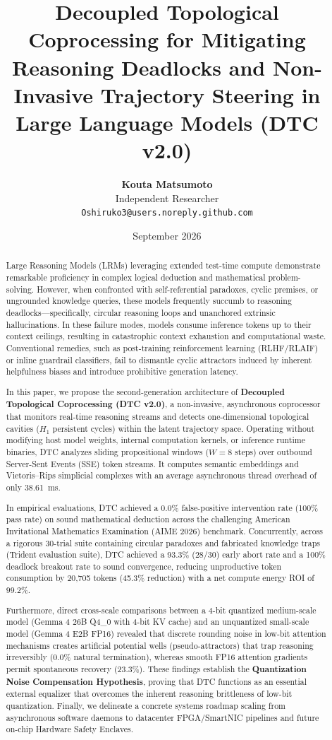 \documentclass[11pt,a4paper]{article}
\title{\textbf{\Large Decoupled Topological Coprocessing for Mitigating Reasoning Deadlocks and Non-Invasive Trajectory Steering in Large Language Models (DTC v2.0)}}
\author{\textbf{Kouta Matsumoto}\\[0.2em]
\normalsize Independent Researcher\\
\normalsize \texttt{Oshiruko3@users.noreply.github.com}}
\date{September 2026}
\begin{document}
\maketitle

\begin{abstract}
\noindent Large Reasoning Models (LRMs) leveraging extended test-time compute demonstrate remarkable proficiency in complex logical deduction and mathematical problem-solving. However, when confronted with self-referential paradoxes, cyclic premises, or ungrounded knowledge queries, these models frequently succumb to reasoning deadlocks---specifically, circular reasoning loops and unanchored extrinsic hallucinations. In these failure modes, models consume inference tokens up to their context ceilings, resulting in catastrophic context exhaustion and computational waste. Conventional remedies, such as post-training reinforcement learning (RLHF/RLAIF) or inline guardrail classifiers, fail to dismantle cyclic attractors induced by inherent helpfulness biases and introduce prohibitive generation latency.

In this paper, we propose the second-generation architecture of \textbf{Decoupled Topological Coprocessing (DTC v2.0)}, a non-invasive, asynchronous coprocessor that monitors real-time reasoning streams and detects one-dimensional topological cavities ($H_1$ persistent cycles) within the latent trajectory space. Operating without modifying host model weights, internal computation kernels, or inference runtime binaries, DTC analyzes sliding propositional windows ($W=8$ steps) over outbound Server-Sent Events (SSE) token streams. It computes semantic embeddings and Vietoris--Rips simplicial complexes with an average asynchronous thread overhead of only 38.61~ms.

In empirical evaluations, DTC achieved a 0.0\% false-positive intervention rate (100\% pass rate) on sound mathematical deduction across the challenging American Invitational Mathematics Examination (AIME 2026) benchmark. Concurrently, across a rigorous 30-trial suite containing circular paradoxes and fabricated knowledge traps (Trident evaluation suite), DTC achieved a 93.3\% (28/30) early abort rate and a 100\% deadlock breakout rate to sound convergence, reducing unproductive token consumption by 20,705 tokens (45.3\% reduction) with a net compute energy ROI of 99.2\%.

Furthermore, direct cross-scale comparisons between a 4-bit quantized medium-scale model (Gemma 4 26B Q4\_0 with 4-bit KV cache) and an unquantized small-scale model (Gemma 4 E2B FP16) revealed that discrete rounding noise in low-bit attention mechanisms creates artificial potential wells (pseudo-attractors) that trap reasoning irreversibly (0.0\% natural termination), whereas smooth FP16 attention gradients permit spontaneous recovery (23.3\%). These findings establish the \textbf{Quantization Noise Compensation Hypothesis}, proving that DTC functions as an essential external equalizer that overcomes the inherent reasoning brittleness of low-bit quantization. Finally, we delineate a concrete systems roadmap scaling from asynchronous software daemons to datacenter FPGA/SmartNIC pipelines and future on-chip Hardware Safety Enclaves.
\end{abstract}
\end{document}
